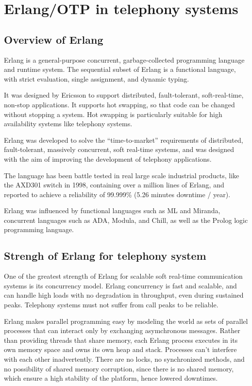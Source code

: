 \chapter{Erlang/OTP in telephony systems}
\label{ch:erlang}

\section{Overview of Erlang}
Erlang is a general-purpose concurrent, garbage-collected programming language and runtime system. The sequential subset of Erlang is a functional language, with strict evaluation, single assignment, and dynamic typing.

It was designed by Ericsson to support distributed, fault-tolerant, soft-real-time, non-stop applications. It supports hot swapping, so that code can be changed without stopping a system. Hot swapping is particularly suitable for high availability systems like telephony systems.

Erlang was developed to solve the “time-to-market” requirements of distributed, fault-tolerant, massively concurrent, soft real-time systems, and was designed with the aim of improving the development of telephony applications.

The language has been battle tested in real large scale industrial products, like the AXD301 switch in 1998, containing over a million lines of Erlang, and reported to achieve a reliability of 99.999\% (5.26 minutes downtime / year).

Erlang was influenced by functional languages such as ML and Miranda, concurrent languages such as ADA, Modula, and Chill, as well as the Prolog logic programming language.

\section{Strengh of Erlang for telephony system}
One of the greatest strength of Erlang for scalable soft real-time communication systems is its concurrency model. Erlang concurrency is fast and scalable, and can handle high loads with no degradation in throughput, even during sustained peaks. Telephony systems must not suffer from call peaks to be reliable.

Erlang makes parallel programming easy by modeling the world as sets of parallel processes that can interact only by exchanging asymchronous messages. Rather than providing threads that share memory, each Erlang process executes in its own memory space and owns its own heap and stack. Processes can’t interfere with each other inadvertently. There are no locks, no synchronized methods, and no possibility of shared memory corruption, since there is no shared memory, which ensure a high stability of the platform, hence lowered downtimes.

